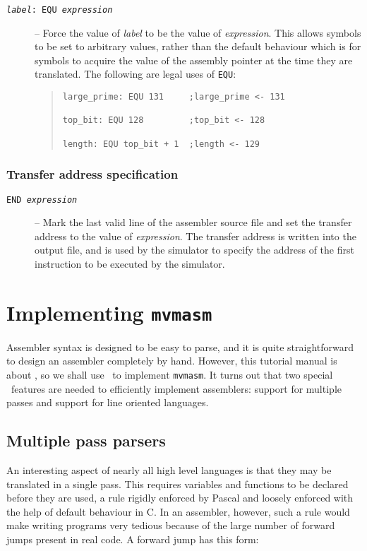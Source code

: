 \begin{description}
\item[{\tt {\em label}: EQU {\em expression}}]
--
Force the value of {\em label} to
be the value of {\em expression}. This allows symbols to be set to arbitrary values, rather
than the default behaviour which is for symbols to acquire the value of
the assembly pointer at the time they are translated. The following are
legal uses of {\tt EQU}:
\begin{quote}
\small
\begin{verbatim}
large_prime: EQU 131     ;large_prime <- 131

top_bit: EQU 128         ;top_bit <- 128

length: EQU top_bit + 1  ;length <- 129
\end{verbatim}
\end{quote}
\end{description}

\subsubsection{Transfer address specification}

\begin{description}
\item[{\tt END {\em expression}}]
--
Mark the last valid line of the assembler source file and
set the transfer address to the value of {\em expression}. The transfer
address is written into the output file, and is used by the simulator to
specify the address of the first instruction to be executed by the simulator.
\end{description}

\section{Implementing {\tt mvmasm}}

Assembler syntax is designed to be easy to parse, and it  is quite
straightforward to design an assembler completely by hand. However, this
tutorial manual is about \rdp, so we shall use \rdp\ to implement
{\tt mvmasm}. It turns out that two special \rdp\
features are needed to efficiently implement assemblers: support for
multiple passes and support for line oriented languages.

\subsection{Multiple pass parsers}
An interesting aspect of nearly all high level languages is that they
may be translated in a single pass. This requires variables and
functions to be declared before they are used, a rule rigidly enforced
by Pascal and loosely enforced with the help of default behaviour in C. 
In an assembler, however, such a rule would make writing programs very tedious
because of the large number of forward jumps present in real code. A forward jump
has this form:

